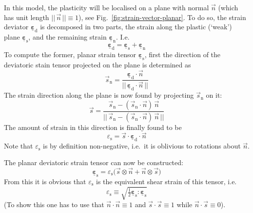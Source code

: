 \documentclass[times,namecite]{goose-article}
\newcommand\T[1]{\underline{\bm{{#1}}}}
\begin{document}
In this model, the plasticity will be localised on a plane with normal $\vec{n}$ (which has unit length $||\, \vec{n} \,|| \equiv 1$), see Fig.~\ref{fig:strain-vector-planar}. To do so, the strain deviator $\T{\varepsilon}_\mathrm{d}$ is decomposed in two parts, the strain along the plastic (`weak') plane $\T{\varepsilon}_\mathrm{s}$, and the remaining strain $\T{\varepsilon}_\mathrm{n}$. I.e.
\begin{equation}
    \label{eq:planar:strain:decomposition}
    \T{\varepsilon}_\mathrm{d} = \T{\varepsilon}_\mathrm{s} + \T{\varepsilon}_\mathrm{n}
\end{equation}
To compute the former, planar strain tensor $\T{\varepsilon}_\mathrm{s}$, first the direction of the deviatoric stain tensor projected on the plane is determined as
\begin{equation}
    \vec{s}_\mathrm{n} =
    \frac{
        \T{\varepsilon}_\mathrm{d} \cdot \vec{n}
    }
    {
        ||\, \T{\varepsilon}_\mathrm{d} \cdot \vec{n} \,||
    }
\end{equation}
The strain direction along the plane is now found by projecting $\vec{s}_\mathrm{n}$ on it:
\begin{equation}
    \vec{s} =
    \frac{
        \vec{s}_\mathrm{n} - ( \vec{s}_\mathrm{n} \cdot \vec{n} )\, \vec{n}
    }
    {
        ||\, \vec{s}_\mathrm{n} - ( \vec{s}_\mathrm{n} \cdot \vec{n} )\, \vec{n} \,||
    }
\end{equation}
The amount of strain in this direction is finally found to be
\begin{equation}
    \varepsilon_\mathrm{s} = \vec{s} \cdot \T{\varepsilon}_\mathrm{d} \cdot \vec{n}
\end{equation}
Note that $\varepsilon_\mathrm{s}$ is by definition non-negative, i.e.\ it is oblivious to rotations about $\vec{n}$.

The planar deviatoric strain tensor can now be constructed:
\begin{equation}
    \T{\varepsilon}_\mathrm{s} = \varepsilon_\mathrm{s}
    \big(
        \vec{s} \otimes \vec{n} + \vec{n} \otimes \vec{s}
    \big)
\end{equation}
From this it is obvious that $\varepsilon_\mathrm{s}$ is the equivalent shear strain of this tensor, i.e.
\begin{equation}
    \varepsilon_\mathrm{s}
    \equiv
    \sqrt{ \tfrac{1}{2} \T{\varepsilon}_\mathrm{s} : \T{\varepsilon}_\mathrm{s} }
\end{equation}
(To show this one has to use that $\vec{n} \cdot \vec{n} \equiv 1$ and $\vec{s} \cdot \vec{s} \equiv 1$ while $\vec{n} \cdot \vec{s} \equiv 0$).
\end{document}
